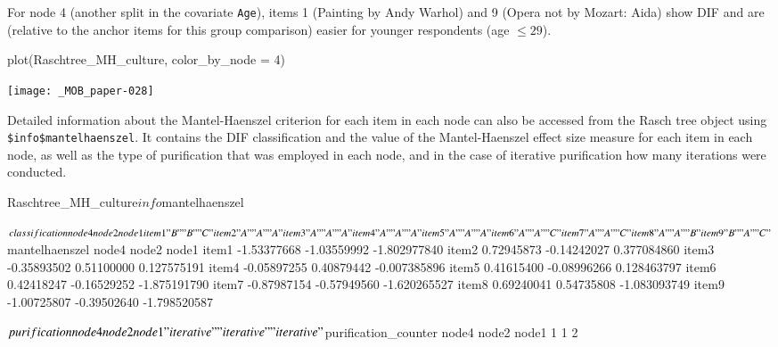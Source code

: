 \documentclass[doc,floatsintext,natbib]{apa7}
\begin{document}
For node 4 (another split in the covariate \texttt{Age}), items 1 (Painting by Andy Warhol) and 9 (Opera not by Mozart: Aida) show DIF and are (relative to the anchor items for this group comparison) easier for younger respondents (age $\leq 29$).

\begin{Schunk}
\begin{Sinput}
 plot(Raschtree_MH_culture, color_by_node = 4)
\end{Sinput}
\end{Schunk}
\texttt{[image: \_MOB\_paper-028]}


Detailed information about the Mantel-Haenszel criterion for each item in each node can also be accessed from the Rasch tree object using \texttt{\$info\$mantelhaenszel}. It contains the DIF classification and the value of the Mantel-Haenszel effect size measure for each item in each node, as well as the type of purification that was employed in each node, and in the case of iterative purification how many iterations were conducted. 

\begin{Schunk}
\begin{Sinput}
 Raschtree_MH_culture$info$mantelhaenszel
\end{Sinput}
\begin{Soutput}
$classification
      node4 node2 node1
item1 "B"   "B"   "C"  
item2 "A"   "A"   "A"  
item3 "A"   "A"   "A"  
item4 "A"   "A"   "A"  
item5 "A"   "A"   "A"  
item6 "A"   "A"   "C"  
item7 "A"   "A"   "C"  
item8 "A"   "A"   "B"  
item9 "B"   "A"   "C"  

$mantelhaenszel
            node4       node2        node1
item1 -1.53377668 -1.03559992 -1.802977840
item2  0.72945873 -0.14242027  0.377084860
item3 -0.35893502  0.51100000  0.127575191
item4 -0.05897255  0.40879442 -0.007385896
item5  0.41615400 -0.08996266  0.128463797
item6  0.42418247 -0.16529252 -1.875191790
item7 -0.87987154 -0.57949560 -1.620265527
item8  0.69240041  0.54735808 -1.083093749
item9 -1.00725807 -0.39502640 -1.798520587

$purification
      node4       node2       node1 
"iterative" "iterative" "iterative" 

$purification_counter
node4 node2 node1 
    1     1     2 
\end{Soutput}
\end{Schunk}
\end{document}
